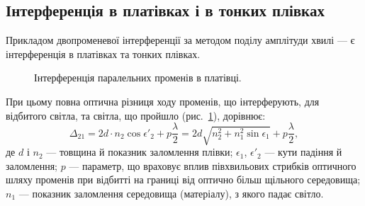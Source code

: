 \subsection*{Інтерференція в платівках і в тонких плівках}

%
%    
%
%

Прикладом двопроменевої інтерференції за методом поділу амплітуди хвилі ---
є інтерференція в платівках та тонких плівках.

\begin{figure}[h!]\centering
	\def\N{2} %
	
	\caption{Інтерференція паралельних променів в платівці.}
	\label{pic:unterferece_in_film}
\end{figure}

При цьому повна оптична різниця ходу променів, що інтерферують, для
відбитого світла, та світла, що пройшло (рис.~\ref{pic:unterferece_in_film}), дорівнює:
\begin{equation}\label{eq:Delta_film}
	\Delta_{21} = 2d\cdot n_2\cos\epsilon'_2 + p\frac{\lambda}{2} = 2d\sqrt{n_2^2 + n_1^2\sin\epsilon_1} + p\frac{\lambda}{2},
\end{equation}
де $d$ і $n_2$ --- товщина й показник заломлення плівки; $\epsilon_1$, $\epsilon'_2$ --- кути падіння й заломлення; $p$ --- параметр, що враховує вплив півхвильових стрибків
оптичного шляху променів при відбитті на границі від оптично більш
щільного середовища; $n_1$ --- показник заломлення середовища (матеріалу), з
якого падає світло.

